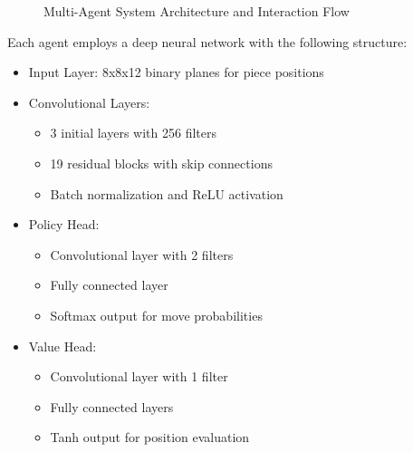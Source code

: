 \documentclass[conference]{IEEEtran}
\begin{document}
\begin{figure}[htbp]
\centering
{}
\caption{Multi-Agent System Architecture and Interaction Flow}
\label{fig:agent_architecture}
\end{figure}

Each agent employs a deep neural network with the following structure:

\begin{itemize}
\item Input Layer: 8x8x12 binary planes for piece positions
\item Convolutional Layers: 
  \begin{itemize}
  \item 3 initial layers with 256 filters
  \item 19 residual blocks with skip connections
  \item Batch normalization and ReLU activation
  \end{itemize}
\item Policy Head: 
  \begin{itemize}
  \item Convolutional layer with 2 filters
  \item Fully connected layer
  \item Softmax output for move probabilities
  \end{itemize}
\item Value Head:
  \begin{itemize}
  \item Convolutional layer with 1 filter
  \item Fully connected layers
  \item Tanh output for position evaluation
  \end{itemize}
\end{itemize}
\end{document}
